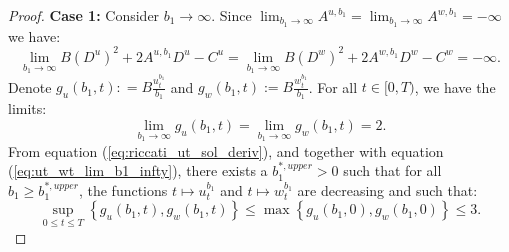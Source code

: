 \documentclass[11pt]{article}
\begin{document}
\begin{proof}
	\textbf{Case 1:} Consider $b_1 \to \infty$. Since $\lim_{b_1 \to \infty} A^{u,b_1} = \lim_{b_1 \to \infty} A^{w,b_1} = - \infty$ we have:
	$$\lim_{b_1 \to \infty}B (D^{u})^2 + 2 A^{u,b_1} D^{u} - C^{u} = \lim_{b_1 \to \infty}B (D^{w})^2 + 2 A^{w,b_1} D^{w} - C^{w}=-\infty.$$
	Denote $g_u(b_1,t): = B \frac{u_t^{b_1}}{b_1}$ and $g_w(b_1,t) := B \frac{w_t^{b_1}}{b_1}$. For all $t \in [0,T)$, we have the limits:
	\begin{equation}
		\lim_{b_1 \to \infty} g_u(b_1,t) =  \lim_{b_1 \to \infty} g_w(b_1,t) = 2.
	\label{eq:ut_wt_lim_b1_infty}
	\end{equation}
	From equation (\ref{eq:riccati_ut_sol_deriv}), and together with equation (\ref{eq:ut_wt_lim_b1_infty}), there exists a $b_1^{*,upper} >0$ such that for all $b_1 \geq b_1^{*,upper}$, the functions $t \mapsto u_t^{b_1}$ and $t \mapsto w_t^{b_1}$ are decreasing and such that:
	$$ \sup_{0 \leq t \leq T} \left\{ g_u(b_1, t), g_w(b_1,t)\right\} \leq \max \left\{ g_u(b_1, 0), g_w(b_1,0) \right\} \leq 3.$$
	

\end{proof}
\end{document}
